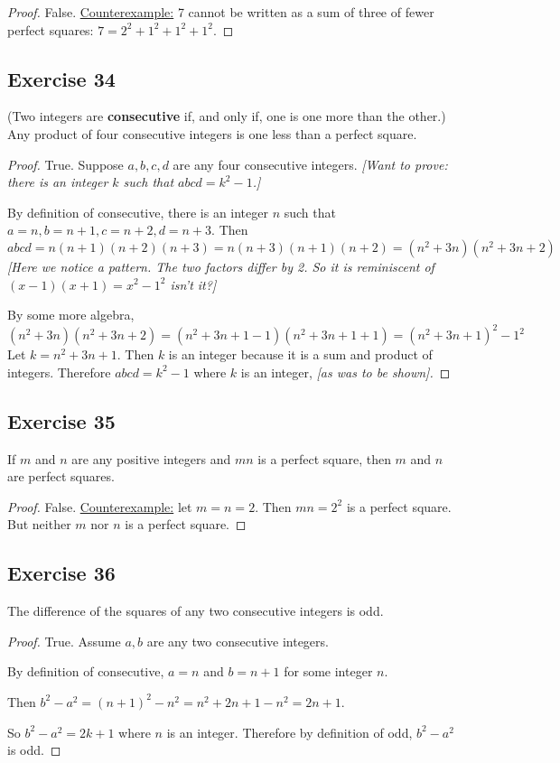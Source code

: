 \documentclass[14pt]{extarticle}
\begin{document}
\begin{proof}
    False. \underline{Counterexample:} 7 cannot be written as a sum of three of fewer perfect squares: $7 = 2^2 + 1^2 + 1^2 + 1^2$.
\end{proof}

\subsection{Exercise 34}
(Two integers are {\bf consecutive} if, and only if, one is one more than the other.) Any product of four consecutive integers is one less than a perfect square.

\begin{proof}
    True. Suppose $a, b, c, d$ are any four consecutive integers. {\it [Want to prove: there is an integer $k$ such that $abcd = k^2 - 1$.]}

    By definition of consecutive, there is an integer $n$ such that $a = n, b = n+1, c = n+2, d = n+3$. Then
    \[
        abcd = n(n+1)(n+2)(n+3) = n(n+3)(n+1)(n+2) = (n^2+3n)(n^2+3n+2)
    \]
    {\it [Here we notice a pattern. The two factors differ by 2. So it is reminiscent of $(x-1)(x+1) = x^2 - 1^2$ isn't it?]}

    By some more algebra,
    \[
        (n^2+3n)(n^2+3n+2) = (n^2+3n+1-1)(n^2+3n+1+1) = (n^2+3n+1)^2-1^2
    \]
    Let $k = n^2+3n+1$. Then $k$ is an integer because it is a sum and product of integers. Therefore $abcd = k^2 - 1$ where $k$ is an integer, {\it [as was to be shown].}
\end{proof}

\subsection{Exercise 35}
If $m$ and $n$ are any positive integers and $mn$ is a perfect square, then $m$ and $n$ are perfect squares.

\begin{proof}
    False. \underline{Counterexample:} let $m = n = 2$. Then $mn = 2^2$ is a perfect square. But neither $m$ nor $n$ is a perfect square.
\end{proof}

\subsection{Exercise 36}
The difference of the squares of any two consecutive integers is odd.

\begin{proof}
    True. Assume $a,b$ are any two consecutive integers.

    By definition of consecutive, $a = n$ and $b = n+1$ for some integer $n$.

    Then $b^2 - a^2 = (n+1)^2 - n^2 = n^2+2n+1-n^2 = 2n+1$.

    So $b^2 - a^2 = 2k+1$ where $n$ is an integer. Therefore by definition of odd, $b^2-a^2$ is odd.
\end{proof}
\end{document}
